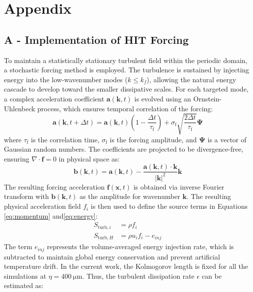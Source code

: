 \documentclass[times,twocolumn,final]{elsarticle}
\newcommand{\mrm}[1]{\mathrm{#1}}
\newcommand{\red}{\color{red}}
\newcommand{\red}{}
\begin{document}
{\red
\section*{Appendix}

\subsection*{A - Implementation of HIT Forcing}

To maintain a statistically stationary turbulent field within the periodic domain, a stochastic forcing method is employed. The turbulence is sustained by injecting energy into the low-wavenumber modes ($k \leq k_f$), allowing the natural energy cascade to develop toward the smaller dissipative scales. For each targeted mode, a complex acceleration coefficient $\mathbf{a}(\mathbf{k}, t)$ is evolved using an Ornstein-Uhlenbeck process, which ensures temporal correlation of the forcing:
\begin{equation}
    \mathbf{a}(\mathbf{k}, t + \Delta t) = \mathbf{a}(\mathbf{k}, t) \left( 1 - \frac{\Delta t}{\tau_\mrm{f}} \right) + \sigma_\mrm{f} \sqrt{\frac{2 \Delta t}{\tau_\mrm{f}}} \mathbf{\Psi}
\end{equation}
where $\tau_\mrm{f}$ is the correlation time, $\sigma_\mrm{f}$ is the forcing amplitude, and $\mathbf{\Psi}$ is a vector of Gaussian random numbers. The coefficients are projected to be divergence-free, ensuring $\nabla \cdot \mathbf{f} = 0$ in physical space as:
\begin{equation}
    \mathbf{b}(\mathbf{k}, t) = \mathbf{a}(\mathbf{k}, t) - \frac{\mathbf{a}(\mathbf{k}, t) \cdot \mathbf{k}}{|\mathbf{k}|^2} \mathbf{k}
\end{equation}
The resulting forcing acceleration $\mathbf{f}(\mathbf{x}, t)$ is obtained via inverse Fourier transform with $\mathbf{b}(\mathbf{k}, t)$ as the amplitude for wavenumber $\mathbf{k}$. The resulting physical acceleration field $f_i$ is then used to define the source terms in Equations \ref{eq:momentum} and\ref{eq:energy}:
\begin{align}
    S_{\mrm{turb},i} &= \rho f_i \\
    S_{\mrm{turb},H} &= \rho u_i f_i - e_{inj}
\end{align}
The term $e_{inj}$ represents the volume-averaged energy injection rate, which is subtracted to maintain global energy conservation and prevent artificial temperature drift. In the current work, the Kolmogorov length is fixed for all the simulations at $\eta=\SI{400}{\micro\meter}$. Thus, the turbulent dissipation rate $\epsilon$ can be estimated as:
}
\end{document}
